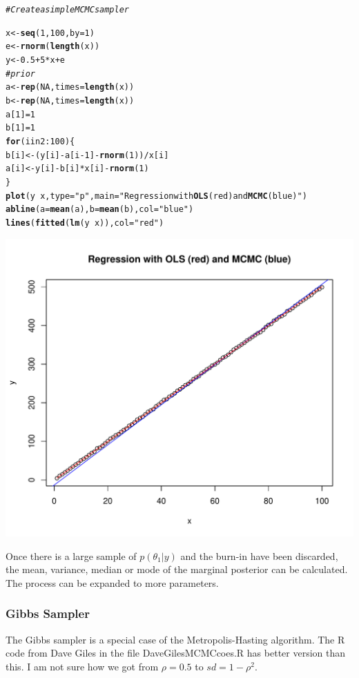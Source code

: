 \documentclass[12pt, a4paper, oneside]{article}\usepackage[]{graphicx}\usepackage[]{color}
\makeatletter
\def\maxwidth{ %
  \ifdim\Gin@nat@width>\linewidth
    \linewidth
  \else
    \Gin@nat@width
  \fi
}
\newcommand{\hlstr}[1]{\textcolor[rgb]{0.192,0.494,0.8}{#1}}%
\newcommand{\hlcom}[1]{\textcolor[rgb]{0.678,0.584,0.686}{\textit{#1}}}%
\newcommand{\hlkwd}[1]{\textcolor[rgb]{0.737,0.353,0.396}{\textbf{#1}}}%
\newenvironment{kframe}{%
 \def\at@end@of@kframe{}%
 \ifinner\ifhmode%
  \def\at@end@of@kframe{\end{minipage}}%
  \begin{minipage}{\columnwidth}%
 \fi\fi%
 \def\FrameCommand##1{\hskip\@totalleftmargin \hskip-\fboxsep
 \colorbox{shadecolor}{##1}\hskip-\fboxsep
     \hskip-\linewidth \hskip-\@totalleftmargin \hskip\columnwidth}%
 \MakeFramed {\advance\hsize-\width
   \@totalleftmargin\z@ \linewidth\hsize
   \@setminipage}}%
 {\par\unskip\endMakeFramed%
 \at@end@of@kframe}
\newenvironment{knitrout}{}{} %
\makeatother
\begin{document}
\begin{knitrout}
\color{fgcolor}\begin{kframe}
\begin{alltt}
\hlcom{# Create a simple MCMC sampler}

x <- \hlkwd{seq}(1, 100, by = 1)
e <- \hlkwd{rnorm}(\hlkwd{length}(x))
y <- 0.5 + 5 * x + e
\hlcom{# prior}
a <- \hlkwd{rep}(NA, times = \hlkwd{length}(x))
b <- \hlkwd{rep}(NA, times = \hlkwd{length}(x))
a[1] = 1
b[1] = 1
\hlkwd{for} (i in 2:100) \{
    b[i] <- (y[i] - a[i - 1] - \hlkwd{rnorm}(1))/x[i]
    a[i] <- y[i] - b[i] * x[i] - \hlkwd{rnorm}(1)
\}
\hlkwd{plot}(y ~ x, type = \hlstr{"p"}, main = \hlstr{"Regression with \hlkwd{OLS} (red) and \hlkwd{MCMC} (blue)"})
\hlkwd{abline}(a = \hlkwd{mean}(a), b = \hlkwd{mean}(b), col = \hlstr{"blue"})
\hlkwd{lines}(\hlkwd{fitted}(\hlkwd{lm}(y ~ x)), col = \hlstr{"red"})
\end{alltt}
\end{kframe}
\includegraphics[width=\maxwidth]{figure/MCMC} 

\end{knitrout}


Once there is a large sample of $p(\theta_1|y)$ and the burn-in have been discarded, the mean, variance, median or mode of the marginal posterior can be calculated.  The process can be expanded to more parameters. 

\subsubsection{Gibbs Sampler}
The Gibbs sampler is a special case of the Metropolis-Hasting algorithm. 
The R code from Dave Giles in the file DaveGilesMCMCcoes.R has better version than this. I am not sure how we got from $\rho = 0.5$ to $sd = 1-\rho^2$. 
\end{document}
